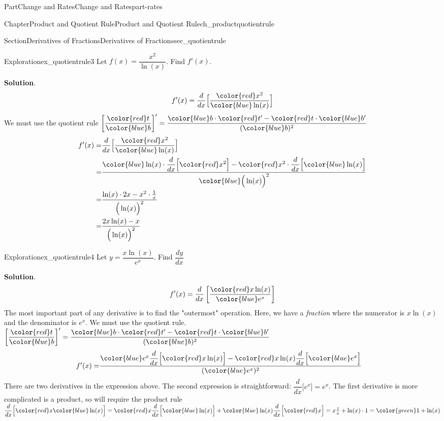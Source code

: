 \documentclass[oneside,10pt,]{tufte-book}
\newcommand{\blocktitlefont}{\relax}
\numberwithin{equation}{chapter}
\newcommand{\red}[1]{   {\color{red}   #1}   }
\newcommand{\blue}[1]{  {\color{blue}  #1}  }
\newcommand{\green}[1]{ {\color{green} #1} }
\newcommand{\ddx}[1]{ \dfrac{d}{dx} \Big[ #1 \Big]  }
\newcommand{\ddxfrac}[1]{ \dfrac{d}{dx} \left[ #1 \right]  }
\newcommand{\amp}{&}
\begin{document}
\begin{partptx}{Part}{Change and Rates}{}{Change and Rates}{}{}{part-rates}
\begin{chapterptx}{Chapter}{Product and Quotient Rule}{}{Product and Quotient Rule}{}{}{ch_productquotientrule}
\begin{sectionptx}{Section}{Derivatives of Fractions}{}{Derivatives of Fractions}{}{}{sec_quotientrule}
\begin{exploration}{Exploration}{}{ex_quotientrule3}%
Let \(f(x) = \dfrac{x^2}{\ln(x)}\). Find \(f'(x)\).%
\par\smallskip%
\noindent\textbf{\blocktitlefont Solution}.\hypertarget{ex_quotientrule3-2}{}\quad{}%
\begin{equation*}
f'(x) = \ddx{ \dfrac{ \red{x^2} }{ \blue{\ln(x)}  } }
\end{equation*}
We must use the quotient rule \(\left[\dfrac{\red{t}}{\blue{b}}\right]' = \dfrac{\blue{b}\cdot \red{t'} - \red{t}\cdot \blue{b'}}{(\blue{b})^2}\)%
\begin{align*}
f'(x) =  \amp \ddx{ \dfrac{ \red{x^2} }{ \blue{\ln(x)}  } } \\
= \amp  \dfrac{ \blue{\ln(x)}\cdot \ddx{\red{x^2}} - \red{x^2}\cdot \ddx{\blue{\ln(x)}} }{ \blue{\Big(\ln(x)\Big)^2}  } \\
= \amp \dfrac{ \ln(x) \cdot 2x - x^2\cdot \frac{1}{x} }{ \Big(\ln(x)\Big)^2 }\\
= \amp \dfrac{ 2x\ln(x)- x }{ \Big(\ln(x)\Big)^2 }
\end{align*}
%
\end{exploration}%
\begin{exploration}{Exploration}{}{ex_quotientrule4}%
Let \(y= \dfrac{x\ln(x)}{e^x}\). Find \(\dfrac{dy}{dx}\)%
\par\smallskip%
\noindent\textbf{\blocktitlefont Solution}.\hypertarget{ex_quotientrule4-2}{}\quad{}%
\begin{equation*}
f'(x) = \ddxfrac{ \dfrac{ \red{ x\ln(x)} }{ \blue{e^x} } }
\end{equation*}
The most important part of any derivative is to find the "outermost" operation. Here, we have a \emph{fraction} where the numerator is \(x\ln(x)\) and the denominator is \(e^x\). We must use the quotient rule. \(\left[\dfrac{\red{t}}{\blue{b}}\right]' = \dfrac{\blue{b}\cdot \red{t'} - \red{t}\cdot \blue{b'}}{(\blue{b})^2}\)%
\begin{align*}
f'(x) = \amp \dfrac{\blue{e^x} \ddx{\red{x\ln(x)}} - \red{x\ln(x)}\ddx{\blue{e^x}}}{(\blue{e^x})^2}
\end{align*}
There are two derivatives in the expression above.  The second expression is straightforward: \(\ddx{e^x}=e^x\).  The first derivative is more complicated is a product, so will require the product rule \(\ddx{\red{x} \blue{\ln(x)}} = \red{x}\ddx{\blue{\ln(x)}} + \blue{\ln(x)}\ddx{\red{x}} = x\frac{1}{x} + \ln(x)\cdot 1 = \green{1 + \ln(x)}\)%
\begin{align*}

\end{align*}
\end{exploration}
\end{sectionptx}
\end{chapterptx}
\end{partptx}
\end{document}

